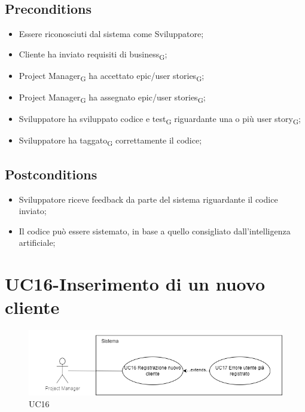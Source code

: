 \documentclass{article}
\begin{document}
    \subsection*{Preconditions}
        \begin{itemize}
            \item Essere riconosciuti dal sistema come Sviluppatore;
            \item Cliente ha inviato requisiti di business\textsubscript{G};
            \item Project Manager\textsubscript{G} ha accettato epic/user stories\textsubscript{G};
            \item Project Manager\textsubscript{G} ha assegnato epic/user stories\textsubscript{G};
            \item Sviluppatore ha sviluppato codice e test\textsubscript{G} riguardante una o più user story\textsubscript{G};
            \item Sviluppatore ha taggato\textsubscript{G} correttamente il codice;
        \end{itemize}
        
    \subsection*{Postconditions}
        \begin{itemize}
            \item Sviluppatore riceve feedback da parte del sistema riguardante il codice inviato;
            \item Il codice può essere sistemato, in base a quello consigliato dall'intelligenza artificiale;
        \end{itemize}
    

        
\section{UC16-Inserimento di un nuovo cliente}
    \begin{figure}[h]
      \centering
      \includegraphics{./imgUML/UC16.png}
    \caption{UC16}
      \label{fig:UC16}
    \end{figure}
    
\end{document}
